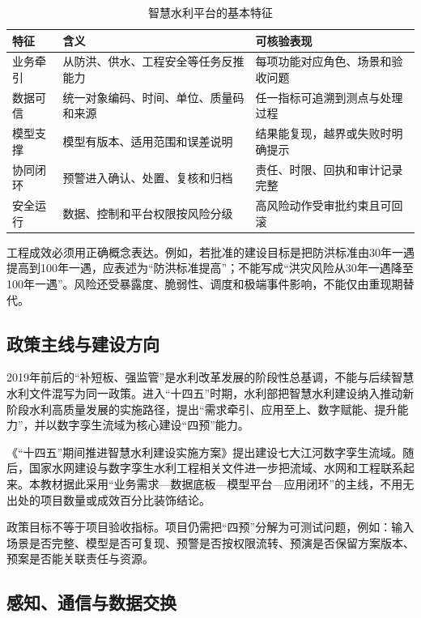 \begin{table}[htbp]
\centering
\caption{智慧水利平台的基本特征}
\label{tab:smart-water-features}
\begin{tabular}{p{2.4cm}p{5.0cm}p{5.2cm}}
\toprule
特征 & 含义 & 可核验表现 \\
\midrule
业务牵引 & 从防洪、供水、工程安全等任务反推能力 & 每项功能对应角色、场景和验收问题 \\
数据可信 & 统一对象编码、时间、单位、质量码和来源 & 任一指标可追溯到测点与处理过程 \\
模型支撑 & 模型有版本、适用范围和误差说明 & 结果能复现，越界或失败时明确提示 \\
协同闭环 & 预警进入确认、处置、复核和归档 & 责任、时限、回执和审计记录完整 \\
安全运行 & 数据、控制和平台权限按风险分级 & 高风险动作受审批约束且可回滚 \\
\bottomrule
\end{tabular}
\end{table}

工程成效必须用正确概念表达。例如，若批准的建设目标是把防洪标准由30年一遇提高到100年一遇，应表述为“防洪标准提高”；不能写成“洪灾风险从30年一遇降至100年一遇”。风险还受暴露度、脆弱性、调度和极端事件影响，不能仅由重现期替代。

\subsection{政策主线与建设方向}

2019年前后的“补短板、强监管”是水利改革发展的阶段性总基调，不能与后续智慧水利文件混写为同一政策。进入“十四五”时期，水利部把智慧水利建设纳入推动新阶段水利高质量发展的实施路径，提出“需求牵引、应用至上、数字赋能、提升能力”，并以数字孪生流域为核心建设“四预”能力\cite{smartWaterGuidance2021}。

《“十四五”期间推进智慧水利建设实施方案》提出建设七大江河数字孪生流域\cite{smartWaterGuidance2021}。随后，国家水网建设与数字孪生水利工程相关文件进一步把流域、水网和工程联系起来\cite{nationalWaterNetwork2023,twinProject2024}。本教材据此采用“业务需求—数据底板—模型平台—应用闭环”的主线，不用无出处的项目数量或成效百分比装饰结论。

政策目标不等于项目验收指标。项目仍需把“四预”分解为可测试问题，例如：输入场景是否完整、模型是否可复现、预警是否按权限流转、预演是否保留方案版本、预案是否能关联责任与资源。

\subsection{感知、通信与数据交换}

